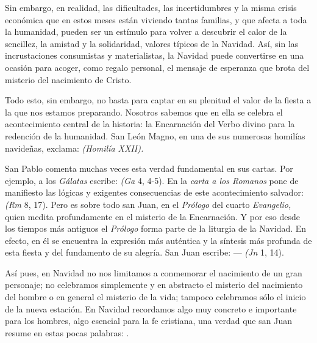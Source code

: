 Sin embargo, en realidad, las dificultades, las incertidumbres y la misma crisis económica que en estos meses están viviendo tantas familias, y que afecta a toda la humanidad, pueden ser un estímulo para volver a descubrir el calor de la sencillez, la amistad y la solidaridad, valores típicos de la Navidad. Así, sin las incrustaciones consumistas y materialistas, la Navidad puede convertirse en una ocasión para acoger, como regalo personal, el mensaje de esperanza que brota del misterio del nacimiento de Cristo.

Todo esto, sin embargo, no basta para captar en su plenitud el valor de la fiesta a la que nos estamos preparando. Nosotros sabemos que en ella se celebra el acontecimiento central de la historia: la Encarnación del Verbo divino para la redención de la humanidad. San León Magno, en una de sus numerosas homilías navideñas, exclama:  \emph{(Homilía XXII). }

San Pablo comenta muchas veces esta verdad fundamental en sus cartas. Por ejemplo, a los \emph{Gálatas} escribe:  \emph{(Ga} 4, 4-5). En la \emph{carta a los Romanos} pone de manifiesto las lógicas y exigentes consecuencias de este acontecimiento salvador:  \emph{(Rm} 8, 17). Pero es sobre todo san Juan, en el \emph{Prólogo} del cuarto \emph{Evangelio,} quien medita profundamente en el misterio de la Encarnación. Y por eso desde los tiempos más antiguos el \emph{Prólogo} forma parte de la liturgia de la Navidad. En efecto, en él se encuentra la expresión más auténtica y la síntesis más profunda de esta fiesta y del fundamento de su alegría. San Juan escribe:  ---  \emph{(Jn} 1, 14).

Así pues, en Navidad no nos limitamos a conmemorar el nacimiento de un gran personaje; no celebramos simplemente y en abstracto el misterio del nacimiento del hombre o en general el misterio de la vida; tampoco celebramos sólo el inicio de la nueva estación. En Navidad recordamos algo muy concreto e importante para los hombres, algo esencial para la fe cristiana, una verdad que san Juan resume en estas pocas palabras: .


